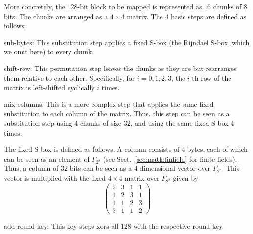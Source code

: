 More concretely, the $128$-bit block to be mapped is represented as $16$ chunks of $8$ bits.
The chunks are arranged as a $4\times 4$ matrix.
The $4$ basic steps are defined as follows:
\begin{compactitem}
  \item sub-bytes: This substitution step applies a fixed S-box (the Rijndael S-box, which we omit here) to every chunk.
  \item shift-row: This permutation step leaves the chunks as they are but rearranges them relative to each other.
    Specifically, for $i=0,1,2,3$, the $i$-th row of the matrix is left-shifted cyclically $i$ times.
  \item mix-columns: This is a more complex step that applies the same fixed substitution to each column of the matrix.
    Thus, this step can be seen as a substitution step using $4$ chunks of size $32$, and using the same fixed S-box $4$ times.
    
    The fixed S-box is defined as follows.
    A column consists of $4$ bytes, each of which can be seen as an element of $F_{2^8}$ (see Sect.~\ref{sec:math:finfield} for finite fields).
    Thus, a column of $32$ bits can be seen as a $4$-dimensional vector over $F_{2^8}$.
    This vector is multiplied with the fixed $4\times 4$ matrix over $F_{2^8}$ given by
    \[\left(\begin{matrix}
    2&3&1&1\\1&2&3&1\\1&1&2&3\\3&1&1&2
   \end{matrix}\right)\]
  \item add-round-key: This key steps xors all $128$ with the respective round key.
\end{compactitem}
